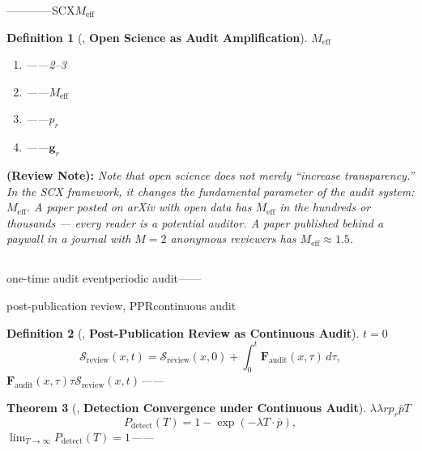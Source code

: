 \documentclass[12pt,a4paper]{article}
\newtheorem{theorem}{Theorem}[section]
\newtheorem{definition}[theorem]{Definition}
\theoremstyle{remark}
\newcommand{\reviewSurf}{\mathcal{S}_{\text{review}}}
\newcommand{\auditForce}{\mathbf{F}_{\text{audit}}}
\newcommand{\gaugeVec}{\mathbf{g}}
\newcommand{\detectProb}{P_{\text{detect}}}
\newcommand{\reviewnote}[1]{%
    \medskip\noindent
    \textbf{ (Review Note):} \textit{#1}%
}
\begin{document}
————SCX\textbf{$M_{\text{eff}}$}

\begin{definition}[, \textbf{Open Science as Audit Amplification}]
\label{def:open_science_audit}
\textbf{}$M_{\text{eff}}$
\begin{enumerate}[label=(\roman*)]
    \item \textbf{}——2--3
    \item \textbf{}——$M_{\text{eff}}$
    \item \textbf{}——$p_r$
    \item \textbf{}——$\gaugeVec_r$
\end{enumerate}
\end{definition}

\reviewnote{Note that open science does not merely ``increase transparency.'' In the SCX framework, it changes the fundamental parameter of the audit system: $M_{\text{eff}}$. A paper posted on arXiv with open data has $M_{\text{eff}}$ in the hundreds or thousands — every reader is a potential auditor. A paper published behind a paywall in a journal with $M=2$ anonymous reviewers has $M_{\text{eff}} \approx 1.5$.}

\subsection{}

\textbf{}one-time audit event\textbf{}periodic audit——

post-publication review, PPR\textbf{}continuous audit

\begin{definition}[, \textbf{Post-Publication Review as Continuous Audit}]
\label{def:ppr_continuous}
$t=0$
\begin{equation}
    \reviewSurf(x, t) = \reviewSurf(x, 0) + \int_0^t \auditForce(x, \tau) \, d\tau,
    \label{eq:continuous_audit}
\end{equation}
$\auditForce(x, \tau)$$\tau$$\reviewSurf(x, t)$——
\end{definition}

\begin{theorem}[, \textbf{Detection Convergence under Continuous Audit}]
\label{thm:continuous_convergence}
$\lambda$$\lambda$$r$$p_r$$\bar{p}$$T$
\begin{equation}
    \detectProb(T) = 1 - \exp(-\lambda T \cdot \bar{p}),
    \label{eq:continuous_detection}
\end{equation}
$\lim_{T \to \infty} \detectProb(T) = 1$——
\end{theorem}
\end{document}
